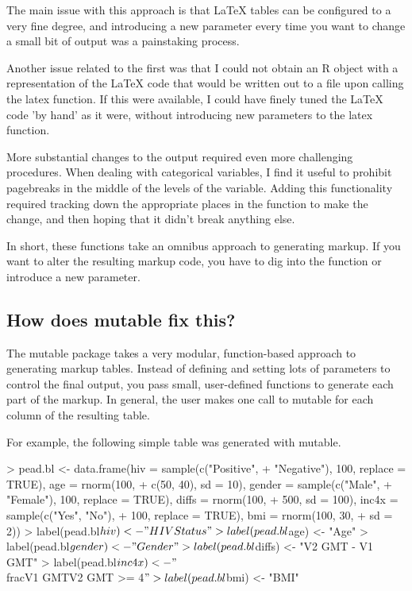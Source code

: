 \documentclass{article}
\begin{document}
The main issue with this approach is that \LaTeX{} tables can be
configured to a very fine degree, and introducing a new parameter
every time you want to change a small bit of output was a painstaking
process.

Another issue related to the first was that I could not obtain an R
object with a representation of the LaTeX code that would be written
out to a file upon calling the latex function.  If this were available,
I could have finely tuned the LaTeX code 'by hand' as it were, without
introducing new parameters to the latex function. 

More substantial changes to the output required even more challenging
procedures.  When dealing with categorical variables, I find it useful
to prohibit pagebreaks in the middle of the levels of the variable.
Adding this functionality required tracking down the appropriate
places in the function to make the change, and then hoping that it
didn't break anything else.

In short, these functions take an omnibus approach to generating
markup.  If you want to alter the resulting markup code, you have to
dig into the function or introduce a new parameter.

\subsection{How does mutable fix this?}
The mutable package takes a very modular, function-based approach to
generating markup tables.  Instead of defining and setting lots of
parameters to control the final output, you pass small, user-defined
functions to generate each part of the markup. In general, the user
makes one call to mutable for each column of the resulting table.

For example, the following simple table was generated with mutable. 

\begin{Schunk}
\begin{Sinput}
> pead.bl <- data.frame(hiv = sample(c("Positive", 
+     "Negative"), 100, replace = TRUE), age = rnorm(100, 
+     c(50, 40), sd = 10), gender = sample(c("Male", 
+     "Female"), 100, replace = TRUE), diffs = rnorm(100, 
+     500, sd = 100), inc4x = sample(c("Yes", "No"), 
+     100, replace = TRUE), bmi = rnorm(100, 30, 
+     sd = 2))
> label(pead.bl$hiv) <- "HIV Status"
> label(pead.bl$age) <- "Age"
> label(pead.bl$gender) <- "Gender"
> label(pead.bl$diffs) <- "V2 GMT - V1 GMT"
> label(pead.bl$inc4x) <- "$\\frac{V1 GMT}{V2 GMT} >= 4$"
> label(pead.bl$bmi) <- "BMI"
\end{Sinput}
\end{Schunk}
\end{document}
